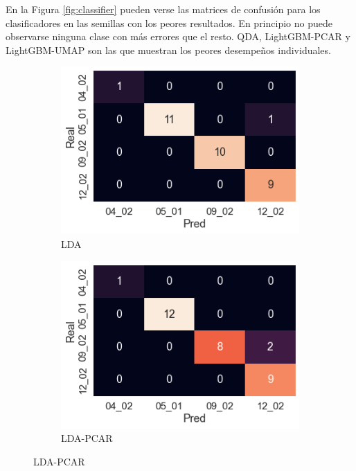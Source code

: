 \documentclass[12pt]{article}
\begin{document}
En la Figura \ref{fig:classifier} pueden verse las matrices de confusión para los clasificadores en las semillas con los peores resultados. En principio no puede observarse ninguna clase con más errores que el resto. QDA, LightGBM-PCAR y LightGBM-UMAP son las que muestran los peores desempeños individuales.

\begin{figure}[htbp]
    \centering
    \begin{subfigure}[b]{0.35\textwidth}
        \caption{LDA}
        \includegraphics[width=\textwidth]{LDA.png}
    \end{subfigure}
    \begin{subfigure}[b]{0.35\textwidth}
        \caption{LDA-PCAR}
        \includegraphics[width=\textwidth]{LDAPCAR.png}

\end{subfigure}
\end{figure}
\end{document}
